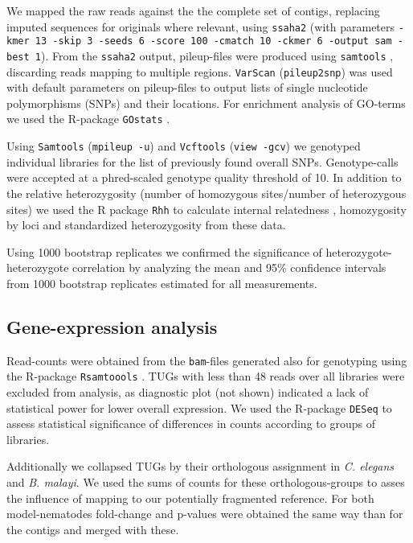 \documentclass[10pt]{bmc_article}
\newenvironment{bmcformat}{\begin{raggedright}\baselineskip20pt\sloppy\setboolean{publ}{false}}{\end{raggedright}\baselineskip20pt\sloppy}
\begin{document}
\begin{bmcformat}
We mapped the raw reads against the the complete set of contigs,
replacing imputed sequences for originals where relevant, using
\texttt{ssaha2} \cite{pmid11591649} (with parameters \texttt{-kmer 13
  -skip 3 -seeds 6 -score 100 -cmatch 10 -ckmer 6 -output sam -best
  1}). From the \texttt{ssaha2} output, pileup-files were produced
using \texttt{samtools} \cite{journals/bioinformatics/LiHWFRHMAD09},
discarding reads mapping to multiple regions. \texttt{VarScan}
\cite{pmid19542151} (\texttt{pileup2snp}) was used with default
parameters on pileup-files to output lists of single nucleotide
polymorphisms (SNPs) and their locations. For enrichment analysis of
GO-terms we used the R-package \texttt{GOstats} \cite{pmid17098774}.

Using \texttt{Samtools} \cite{journals/bioinformatics/LiHWFRHMAD09}
(\texttt{mpileup -u}) and \texttt{Vcftools} \cite{pmid21653522}
(\texttt{view -gcv}) we genotyped individual libraries for the list of
previously found overall SNPs. Genotype-calls were accepted at a
phred-scaled genotype quality threshold of 10. In addition to the
relative heterozygosity (number of homozygous sites/number of
heterozygous sites) we used the R package \texttt{Rhh}
\cite{pmid21565077} to calculate internal relatedness
\cite{pmid11571049}, homozygosity by loci \cite{pmid17107491} and
standardized heterozygosity \cite{coltman81j} from these data.

Using 1000 bootstrap replicates we confirmed the significance of
heterozygote-heterozygote correlation by analyzing the mean and 95\%
confidence intervals from 1000 bootstrap replicates estimated for all
measurements.

\subsection*{Gene-expression analysis}

Read-counts were obtained from the \texttt{bam}-files generated also
for genotyping using the R-package \texttt{Rsamtoools}
\cite{rsamtools}. TUGs with less than 48 reads over all libraries were
excluded from analysis, as diagnostic plot (not shown) indicated a lack
of statistical power for lower overall expression. We used the
R-package \texttt{DESeq} \cite{pmid20979621} to assess statistical
significance of differences in counts according to groups of
libraries.

Additionally we collapsed TUGs by their orthologous assignment in
\textit{C. elegans} and \textit{B. malayi}. We used the sums of counts
for these orthologous-groups to asses the influence of mapping to our
potentially fragmented reference. For both model-nematodes fold-change
and p-values were obtained the same way than for the contigs and
merged with these.


\end{bmcformat}
\end{document}
